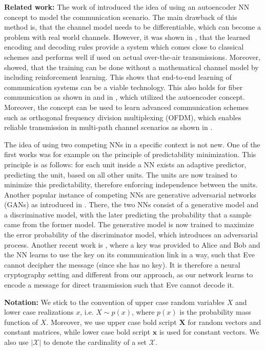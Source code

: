 \documentclass[conference]{IEEEtran}
\begin{document}
{\bf Related work:}
The work of \cite{OShea2017} introduced the idea of using an autoencoder NN concept to model the communication scenario. The main drawback of this method is, that the channel model needs to be differentiable, which can become a problem with real world channels. However, it was shown in \cite{SBrink2018}, that the learned encoding and decoding rules provide a system which comes close to classical schemes and performs well if used on actual over-the-air transmissions. Moreover, \cite{Hoydis2018} showed, that the training can be done without a mathematical channel model by including reinforcement learning. This shows that end-to-end learning of communication systems can be a viable technology. This also holds for fiber communication as shown in \cite{li2018achievableFiber} and in \cite{karanov2018endFiber}, which utilized the autoencoder concept. Moreover, the concept can be used to learn advanced communication schemes such as orthogonal frequency division multiplexing (OFDM), which enables reliable transmission in multi-path channel scenarios as shown in \cite{felix2018ofdm}. 

The idea of using two competing NNs in a specific context is not new. One of the first works was for example \cite{schmidhuber1992learning} on the principle of predictability minimization. This principle is as follows: for each unit inside a NN exists an adaptive predictor, predicting the unit, based on all other units. The units are now trained to minimize this predictability, therefore enforcing independence between the units. Another popular instance of competing NNs are generative adversarial networks (GANs) as introduced in \cite{goodfellow2014generative}.
There, the two NNs consist of a generative model and a discriminative model, with the later predicting the probability that a sample came from the former model. The generative model is now trained to maximize the error probability of the discriminator model, which introduces an adversarial process. Another recent work is \cite{abadi2016learning}, where a key was provided to Alice and Bob and the NN learns to use the key on its communication link in a way, such that Eve cannot decipher the message (since she has no key). It is therefore a neural cryptography setting and different from our approach, as our network learns to encode a message for direct transmission such that Eve cannot decode it.

{\bf Notation:} We stick to the convention of upper case random variables $X$ and lower case realizations $x$, i.e. $X\sim p(x)$, where $p(x)$ is the probability mass function of $X$. Moreover, we use upper case bold script $\mathbf{X}$ for random vectors and constant matrices, while lower case bold script $\mathbf{x}$ is used for constant vectors. We also use $|\mathcal{X}|$ to denote the cardinality of a set $\mathcal{X}$.
\end{document}
